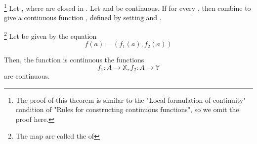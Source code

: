\begin{theorem}\label{theorem:ThePastingLemma}\footnote{
      The proof of this theorem is similar to the "Local formulation of continuity" condition of "Rules for constructing continuous functions", so we omit the proof here.
}
      Let , where  are closed in . Let  and  be continuous. If  for every , then  combine to give a continuous function , defined by setting  and .
\end{theorem}

\begin{theorem}\label{theorem:MapsIntoProducts} \footnote{
      The map  are called the \label{def:CoordinateFunctions} of 
}
      Let  be given by the equation
      \begin{equation*}
            f(a) = (f_{1}(a),f_{2}(a))
      \end{equation*}

      Then, the function  is continuous \ioi the functions
      \begin{equation*}
            f_{1}: A \rightarrow \mathbb{X}, f_{2}: A \rightarrow \mathbb{Y}
      \end{equation*}
      are continuous.
\end{theorem}

